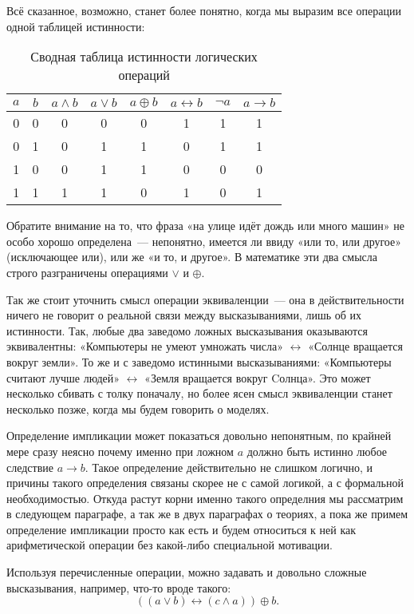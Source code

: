 Всё сказанное, возможно, станет более понятно, когда мы выразим все операции одной таблицей истинности:

\begin{table}[h]
\centering
\begin{tabular}{cc|cccccc}
$a$ & $b$ & $a\land b$ & $a\lor b$ & $a\oplus b$ & $a\leftrightarrow b$ & $\neg a$ & $a \to b$\\
\hline
0 & 0 & 0 & 0 & 0 & 1 & 1 & 1 \\
0 & 1 & 0 & 1 & 1 & 0 & 1 & 1 \\
1 & 0 & 0 & 1 & 1 & 0 & 0 & 0 \\
1 & 1 & 1 & 1 & 0 & 1 & 0 & 1
\end{tabular}
\caption{Сводная таблица истинности логических операций}
\end{table}

Обратите внимание на то, что фраза «на улице идёт дождь или много машин» не особо хорошо определена~--- непонятно, имеется ли ввиду «или то, или другое» (исключающее или), или же «и то, и другое». В математике эти два смысла строго разграничены операциями $\lor$ и $\oplus$.

Так же стоит уточнить смысл операции эквиваленции~--- она в действительности ничего не говорит о реальной связи между высказываниями, лишь об их истинности. Так, любые два заведомо ложных высказывания оказываются эквивалентны: «Компьютеры не умеют умножать числа» $\leftrightarrow$ «Солнце вращается вокруг земли». То же и с заведомо истинными высказываниями: «Компьютеры считают лучше людей» $\leftrightarrow$ «Земля вращается вокруг Cолнца». Это может несколько сбивать с толку поначалу, но более ясен смысл эквиваленции станет несколько позже, когда мы будем говорить о моделях.

Определение импликации может показаться довольно непонятным, по крайней мере сразу неясно почему именно при ложном $a$ должно быть истинно любое следствие $a\to b$. Такое определение действительно не слишком логично, и причины такого определения связаны скорее не с самой логикой, а с формальной необходимостью. Откуда растут корни именно такого определния мы рассматрим в следующем параграфе, а так же в двух параграфах о теориях, а пока же примем определение импликации просто как есть и будем относиться к ней как арифметической операции без какой-либо специальной мотивации.

Используя перечисленные операции, можно задавать и довольно сложные высказывания, например, что-то вроде такого:
$$
((a \lor b) \leftrightarrow (c \land a)) \oplus b.
$$

